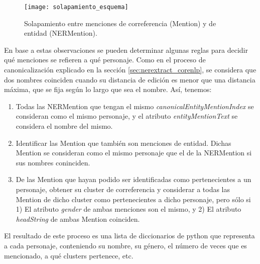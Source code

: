 \documentclass{pre-tfg}
\begin{document}

\begin{figure}
	\centering
	\texttt{[image: solapamiento\_esquema]}
	\caption{Solapamiento entre menciones de correferencia (Mention) y de entidad (NERMention).}
	\label{fig:solapamiento_esquema}
\end{figure}

En base a estas observaciones se pueden determinar algunas reglas para decidir qué menciones se refieren a qué personaje. Como en el proceso de canonicalización explicado en la sección \ref{sec:nerextract_corenlp}, se considera que dos nombres coinciden cuando su distancia de edición \cite{levenshtein_1966} es menor que una distancia máxima, que se fija según lo largo que sea el nombre. Así, tenemos:

\begin{enumerate}
	\item Todas las NERMention que tengan el mismo \textit{canonicalEntityMentionIndex} se consideran como el mismo personaje, y el atributo \textit{entityMentionText} se considera el nombre del mismo.
	\item Identificar las Mention que también son menciones de entidad. Dichas Mention se consideran como el mismo personaje que el de la NERMention si sus nombres coninciden.
	\item De las Mention que hayan podido ser identificadas como pertenecientes a un personaje, obtener su cluster de correferencia y considerar a todas las Mention de dicho cluster como pertenecientes a dicho personaje, pero sólo si 1) El atributo \textit{gender} de ambas menciones son el mismo, y 2) El atributo \textit{headString} de ambas Mention coinciden.
\end{enumerate}

El resultado de este proceso es una lista de diccionarios de python que representa a cada personaje, conteniendo su nombre, su género, el número de veces que es mencionado, a qué clusters pertenece, etc.
\end{document}
